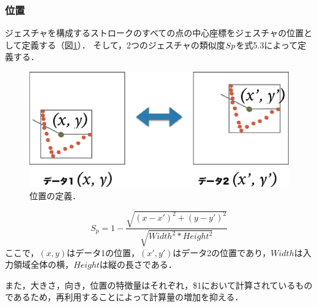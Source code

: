 \subsubsection{位置}
ジェスチャを構成するストロークのすべての点の中心座標をジェスチャの位置として定義する（図\ref{fig:v_position}）．
そして，2つのジェスチャの類似度$S{\scriptsize p}$を式5.3によって定義する．

\begin{figure} [h!]
	\begin{center}
		\includegraphics [width=0.55\hsize ]{img/v_position.eps}
	\end{center}
	\caption{位置の定義．}
	\label{fig:v_position}
\end{figure}


\begin{equation}
S_\textit{p} = 1 - \frac{\sqrt{(x - x')^2 + (y - y')^2}}{\sqrt{W\!idt\!h^2 * H\!ei\!ght^2}}
\end{equation}
ここで，$(x, y)$はデータ1の位置，$(x', y')$はデータ2の位置であり，$Width$は入力領域全体の横，$Height$は縦の長さである．

また，大きさ，向き，位置の特徴量はそれぞれ，\$1において計算されているものであるため，再利用することによって計算量の増加を抑える．

